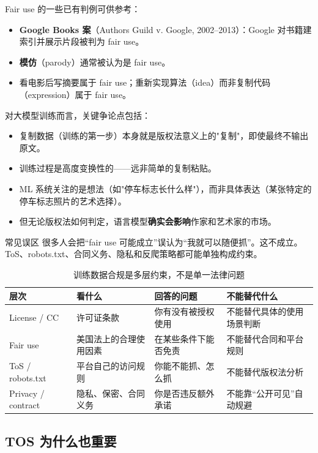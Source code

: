 Fair use 的一些已有判例可供参考：
\begin{itemize}
    \item \textbf{Google Books 案}（Authors Guild v. Google, 2002--2013）：Google 对书籍建索引并展示片段被判为 fair use。
    \item \textbf{模仿}（parody）通常被认为是 fair use。
    \item 看电影后写摘要属于 fair use；重新实现算法（idea）而非复制代码（expression）属于 fair use。
\end{itemize}

对大模型训练而言，关键争论点包括：
\begin{itemize}
    \item 复制数据（训练的第一步）本身就是版权法意义上的"复制"，即使最终不输出原文。
    \item 训练过程是高度变换性的——远非简单的复制粘贴。
    \item ML 系统关注的是想法（如"停车标志长什么样"），而非具体表达（某张特定的停车标志照片的艺术选择）。
    \item 但无论版权法如何判定，语言模型\textbf{确实会影响}作家和艺术家的市场。
\end{itemize}

\begin{warningbox}{常见误区}
很多人会把“fair use 可能成立”误认为“我就可以随便抓”。这不成立。ToS、robots.txt、合同义务、隐私和反爬策略都可能单独构成约束。
\end{warningbox}

\begin{table}[H]
\centering
\begin{tabular}{p{}p{}p{}p{}}
\toprule
\textbf{层次} & \textbf{看什么} & \textbf{回答的问题} & \textbf{不能替代什么} \\
\midrule
License / CC & 许可证条款 & 你有没有被授权使用 & 不能替代具体的使用场景判断 \\
Fair use & 美国法上的合理使用因素 & 在某些条件下能否免责 & 不能替代合同和平台规则 \\
ToS / robots.txt & 平台自己的访问规则 & 你能不能抓、怎么抓 & 不能替代版权法分析 \\
Privacy / contract & 隐私、保密、合同义务 & 你是否违反额外承诺 & 不能靠“公开可见”自动规避 \\
\bottomrule
\end{tabular}
\caption{训练数据合规是多层约束，不是单一法律问题}
\end{table}

\subsection{TOS 为什么也重要}

